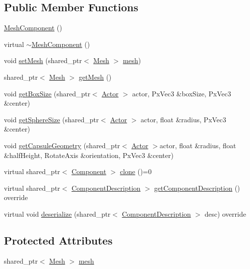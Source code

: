 \subsection*{Public Member Functions}
\begin{DoxyCompactItemize}
\item 
\hyperlink{class_mesh_component_a6f23f9f4c0fb23ee33a3798708c9a741}{Mesh\+Component} ()
\item 
virtual \hyperlink{class_mesh_component_a14f087d42e725d37d2414c7f32ca941a}{$\sim$\+Mesh\+Component} ()
\item 
void \hyperlink{class_mesh_component_a2971b2218704573c8bfc1e2ac0aa4fae}{set\+Mesh} (shared\+\_\+ptr$<$ \hyperlink{class_mesh}{Mesh} $>$ \hyperlink{class_mesh_component_ae985ae250fc6887e255e75f4c9a165dc}{mesh})
\item 
shared\+\_\+ptr$<$ \hyperlink{class_mesh}{Mesh} $>$ \hyperlink{class_mesh_component_a1388746fe37a996d6a17e4625ab0968a}{get\+Mesh} ()
\item 
void \hyperlink{class_mesh_component_a9d32173d75e3fa307cb53347e06bd325}{get\+Box\+Size} (shared\+\_\+ptr$<$ \hyperlink{class_actor}{Actor} $>$ actor, Px\+Vec3 \&box\+Size, Px\+Vec3 \&center)
\item 
void \hyperlink{class_mesh_component_a2dc1677ff14f5af49ec20bcaa84799b0}{get\+Sphere\+Size} (shared\+\_\+ptr$<$ \hyperlink{class_actor}{Actor} $>$ actor, float \&radius, Px\+Vec3 \&center)
\item 
void \hyperlink{class_mesh_component_acb19dbc4dfc54a99aa55538155cc459d}{get\+Capsule\+Geometry} (shared\+\_\+ptr$<$ \hyperlink{class_actor}{Actor} $>$actor, float \&radius, float \&half\+Height, Rotate\+Axis \&orientation, Px\+Vec3 \&center)
\item 
virtual shared\+\_\+ptr$<$ \hyperlink{class_component}{Component} $>$ \hyperlink{class_mesh_component_ace2f1acdce65f1c37b56a5b3ef507e8d}{clone} ()=0
\item 
virtual shared\+\_\+ptr$<$ \hyperlink{class_component_description}{Component\+Description} $>$ \hyperlink{group__serialization__functions_ga10950983c0abed7fc5381383e211904f}{get\+Component\+Description} () override
\item 
virtual void \hyperlink{group__serialization__functions_gac2630e3fbb6a7eeb6b2f6d40e2a67bfa}{deserialize} (shared\+\_\+ptr$<$ \hyperlink{class_component_description}{Component\+Description} $>$ desc) override
\end{DoxyCompactItemize}
\subsection*{Protected Attributes}
\begin{DoxyCompactItemize}
\item 
shared\+\_\+ptr$<$ \hyperlink{class_mesh}{Mesh} $>$ \hyperlink{class_mesh_component_ae985ae250fc6887e255e75f4c9a165dc}{mesh}
\end{DoxyCompactItemize}
